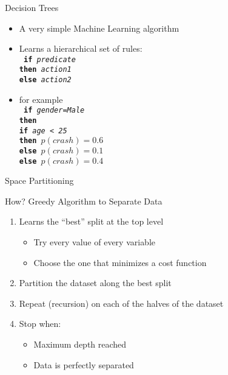 \documentclass{beamer}
\begin{document}
\begin{frame}{Decision Trees}
  \begin{itemize}
  \item A very simple Machine Learning algorithm
  \item Learns a hierarchical set of rules: \\ \vspace{0.2cm}
      \texttt{%
        {\bf if}   \textsl{predicate} \\
        {\bf then} \textsl{action1} \\
        {\bf else} \textsl{action2} \\
      }
    \item for example \\ \vspace{0.2cm}
      \texttt{%
        {\bf if}   \textsl{gender=Male} \\
        {\bf then} \\
        \hspace{1cm} {\bf if}  \textsl{age < 25} \\
        \hspace{1cm} {\bf then} $p(crash) = 0.6$ \\
        \hspace{1cm} {\bf else} $p(crash) = 0.1$ \\
        {\bf else} $p(crash) = 0.4$ \\
      }
  \end{itemize}
\end{frame}


\begin{frame}{Space Partitioning}

  \begin{center}
  \end{center}
  
\end{frame}

\begin{frame}{How?}
  Greedy Algorithm to Separate Data
  \begin{enumerate}
    \item Learns the ``best'' split at the top level
      \begin{itemize}
      \item Try every value of every variable
      \item Choose the one that minimizes a cost function
      \end{itemize}
    \item Partition the dataset along the best split
    \item Repeat (recursion) on each of the halves of the dataset
    \item Stop when:
      \begin{itemize}
      \item Maximum depth reached
      \item Data is perfectly separated
      \end{itemize}
  \end{enumerate}
\end{frame}
\end{document}
